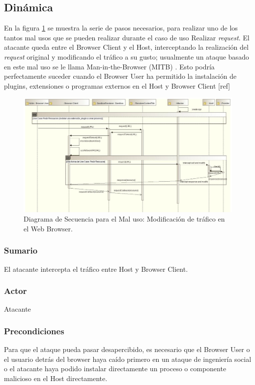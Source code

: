 \subsection{Dinámica}
En la figura \ref{fig:SeqMisuse} se muestra la serie de pasos necesarios, para realizar uno de los tantos mal usos que se pueden realizar durante el caso de uso Realizar \textit{request}. El atacante queda entre el Browser Client y el Host, interceptando la realización del \textit{request} original y modificando el tráfico a su gusto; usualmente un ataque basado en este mal uso se le llama Man-in-the-Browser (MITB) \cite{Liu2012, Barth2010, Utakrit2009, Dougan2012}. Esto podría perfectamente suceder cuando el Browser User ha permitido la instalación de plugins, extensiones o programas externos en el Host y Browser Client [ref]
\begin{figure}[h!t]
	        \centering
	        \includegraphics[scale=0.45]{figures/chap5/patronMisuseSeq.jpg}
	        \caption{Diagrama de Secuencia para el Mal uso: Modificación de tráfico en el Web Browser.}
	        \label{fig:SeqMisuse}
    \end{figure}
	
	\subsubsection{Sumario} El atacante intercepta el tráfico entre Host y Browser Client.
	\subsubsection{Actor} Atacante
	\subsubsection{Precondiciones} Para que el ataque pueda pasar desapercibido, es necesario que el Browser User o el usuario detrás del browser haya caído primero en un ataque de ingeniería social o el atacante haya podido instalar directamente un proceso o componente malicioso en el Host directamente.
